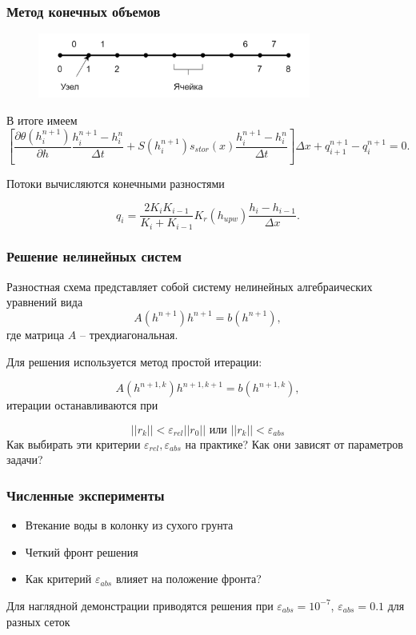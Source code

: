 \documentclass{beamer}
\begin{document}
	
	
	\begin{frame}
		\frametitle{Метод конечных объемов}
		\begin{figure}[h] \centering
			\includegraphics[width=0.8\textwidth]{mesh1d}
		\end{figure}
		
		В итоге имеем
		\begin{equation*}\left[ \frac{\partial \theta(h^{n+1}_i)}{\partial h}
			\frac{h_i^{n+1} - h_i^{n}}{\Delta t} + S(h_i^{n+1})s_{stor}(x)\frac{h_i^{n+1} - h_i^n}{\Delta t}
			\right]\Delta x + q_{i+1}^{n+1} - q_i^{n+1} = 0.
		\end{equation*}
		
		Потоки вычисляются конечными разностями
		
		\begin{equation*}
			q_i = \frac{2K_iK_{i-1}}{K_i + K_{i-1}}K_r(h_{upw})\frac{h_i - h_{i-1}}{\Delta x}.
		\end{equation*}
	\end{frame}
	
	\begin{frame}
	\frametitle{Решение нелинейных систем}
	Разностная схема представляет собой систему нелинейных алгебраических уравнений вида
	\begin{equation*}
		A(h^{n+1})h^{n+1} = b(h^{n+1}),
	\end{equation*}
	где матрица $A$ -- трехдиагональная.
	
	Для решения используется метод простой итерации:
	
	\begin{equation*}
		A(h^{n+1,k})h^{n+1,k+1} = b(h^{n+1,k}),
	\end{equation*}
	итерации останавливаются при
	
	\begin{equation*}
		||r_k|| < \varepsilon_{rel}||r_0||\text{~или~} ||r_k||<\varepsilon_{abs}
	\end{equation*}
	Как выбирать эти критерии $\varepsilon_{rel}, \varepsilon_{abs}$ на практике? Как они зависят от параметров задачи?
	\end{frame}
	
	
	\begin{frame}
	\frametitle{Численные эксперименты}
	\begin{itemize}
		\item Втекание воды в колонку из сухого грунта
		\item Четкий фронт решения
		\item Как критерий $\varepsilon_{abs}$ влияет на положение фронта?
	\end{itemize}
	Для наглядной демонстрации приводятся решения при $\varepsilon_{abs} = 10^{-7}$, $\varepsilon_{abs} = 0.1$ для разных сеток
	\end{frame}
	
\end{document}

